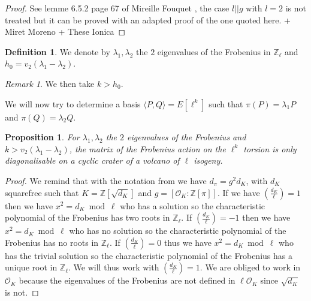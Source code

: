 \documentclass{article}
\theoremstyle{plain}
\newtheorem{prop}[thm]{Proposition}
\theoremstyle{definition}
\newtheorem{defi}[thm]{Definition}
\theoremstyle{remark}
\newtheorem{rem}[thm]{Remark}
\begin{document}
\begin{proof}
See lemme 6.5.2 page 67  of Mireille Fouquet \cite{Fouquet01}, the case $l ||g$ with $l=2$ is not treated but it can be proved with an adapted proof of the one quoted here. + Miret Moreno + These Ionica
\end{proof}

\begin{defi}
We denote by $\lambda_1 , \lambda_2$ the $2$ eigenvalues of the Frobenius in $\mathbb{Z}_\ell$ and $h_0=v_2(\lambda_1-\lambda_2)$. 
\end{defi}

\begin{rem}
We then take $k>h_0$.  
\end{rem}

We will now try to determine a basis $\langle P,Q \rangle = E[\ell^k]$ such that $\pi(P)=\lambda_1 P $ and $\pi(Q)=\lambda_2 Q $.

\begin{prop}
For $\lambda_1 , \lambda_2$ the $2$ eigenvalues of the Frobenius and $k>v_2(\lambda_1-\lambda_2)$, the matrix of the Frobenius action on the $\ell^k$ torsion is only diagonalisable on a cyclic crater of a volcano of $\ell$ isogeny.
\end{prop}

\begin{proof}
We remind that with the notation from \cite{Fouquet01} \cite{Kohel96} we have $d_{\pi}=g^2d_K$, with $d_K$ squarefree such that $K=\mathbb{Z}[\sqrt{d_K}]$ and $g=[\mathcal{O}_K:\mathbb{Z}[\pi]]$.
\newline
If we have $\left( \frac{d_K}{\ell} \right)=1$ then we have $x^2 = d_K \bmod \ell$ who has a solution so the characteristic polynomial of the Frobenius has two roots in $\mathbb{Z}_{\ell}$. If $\left( \frac{d_K}{\ell} \right)=-1$ then we have $x^2 = d_K \bmod \ell$ who has no solution so the characteristic polynomial of the Frobenius has no roots in $\mathbb{Z}_{\ell}$. If $\left( \frac{d_K}{\ell} \right)=0$ thus we have $x^2 = d_K \bmod \ell$ who has the trivial solution so the characteristic polynomial of the Frobenius has a unique root in $\mathbb{Z}_{\ell}$.
\newline
We will thus work with $\left( \frac{d_K}{\ell} \right)=1$. We are obliged to work in $\mathcal{O}_K$  because the eigenvalues of the Frobenius are not defined in $\ell \mathcal{O}_K$ since $\sqrt{d_K}$ is not.
\end{proof}
\end{document}
